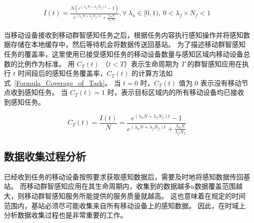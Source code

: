 \begin{equation}
\label{Formula_It_with_fog}
\begin{aligned}
I(t) = \frac{N (e^{(\lambda_n N + \lambda_f N_f) t} - 1)}{e^{(\lambda_n N + \lambda_f N_f) t} + \frac{\lambda_n N}{\lambda_f N_f}}, \forall\ \lambda_n \in [0, 1),\ 0 < \lambda_f \times N_f < 1
\end{aligned}
\end{equation}

当移动设备接收到移动群智感知任务之后，根据任务内容执行感知操作并将感知数据存储在本地缓存中，然后等待机会将数据传送回基站。
为了描述移动群智感知任务的覆盖率，这里使用已接受感知任务的移动设备数量与感知区域内移动设备总数的比例作为标准。
用 $C_T(t)$ （$t < T$）表示生命周期为 $T$ 的群智感知应用在执行 $t$ 时间段后的感知任务覆盖率，$C_T(t)$ 的计算方法如式~\eqref{Formula_Coverage_of_Task}。
当 $t=0$ 时，$C_T(t)$ 值为 0 表示没有移动节点收到感知任务。
当 $C_T(t) = 1$ 时，表示目标区域内的所有移动设备均已接收到感知任务。

\begin{equation}
  \label{Formula_Coverage_of_Task}
  C_T(t) = \frac{I(t)}{N} = \frac{e^{(\lambda_n N + \lambda_f N_f) t} - 1}{e^{(\lambda_n N + \lambda_f N_f) t} + \frac{\lambda_n N}{\lambda_f N_f}}
\end{equation}

\subsection{数据收集过程分析}


已经收到任务的移动设备按照要求获取感知数据后，需要及时地将感知数据传回基站。
而移动群智感知应用在其生命周期内，收集到的数据越多n数据覆盖范围越大，则移动群智感知服务所能提供的服务质量就越高。
这也意味着在规定的时间范围内，基站必须尽可能收集来自所有移动设备上的感知数据。
因此，在时域上分析数据收集过程也是非常重要的工作。

